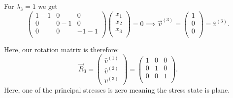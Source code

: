 \begin{derivation}
    For $\lambda_3 = 1$ we get
    \begin{equation*}
      \begin{pmatrix}
        1-1 & 0 & 0\\
      0 & 0-1 & 0\\
      0 & 0 & -1-1\\
      \end{pmatrix} \begin{pmatrix}
        x_1\\
      x_2\\
      x_3\\
      \end{pmatrix} = 0 \implies \Vec{v}^{(3)} = \begin{pmatrix}
        1\\
      0\\
      0\\
      \end{pmatrix} = \hat{v}^{(3)}
    .\end{equation*}
    
    Here, our rotation matrix is therefore:
    \begin{equation*}
      \Vec{R}_3 = \begin{pmatrix}
        \hat{v}^{(1)} \\ \hat{v}^{(2)} \\ \hat{v}^{(3)}
      \end{pmatrix} = \begin{pmatrix}
        1 & 0 & 0\\
      0 & 1 & 0\\
      0 & 0 & 1\\
      \end{pmatrix}
    .\end{equation*}
    Here, one of the principal stresses is zero meaning the stress state is plane.
  \end{derivation}

